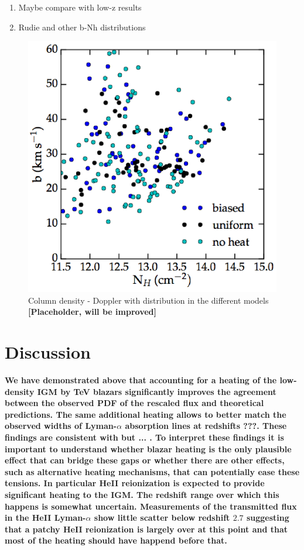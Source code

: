 \documentclass[numberedappendix]{emulateapj}
\newcommand\ALc[1]{{\color{red} \bf #1}} %
\newcommand\Ec[1]{{\color{magenta} \bf #1}} %
\begin{document}
\begin{enumerate}
\item Maybe compare with low-z results
\item Rudie and other b-Nh distributions
\end{enumerate}
\begin{figure}
\centering
\includegraphics[width = .45\textwidth ]{b_Nh}
\caption{ Column density - Doppler with distribution in the different models \ALc{[Placeholder, will be improved]}}
\label{fig:b_Nh}
\end{figure}



\section{Discussion}\label{sec:discussion}

\Ec{We have demonstrated above that accounting for a heating of the low-density IGM by TeV blazars significantly improves the agreement between the observed PDF of the rescaled flux and theoretical predictions. The same additional heating allows to better match the observed widths of Lyman-$\alpha$ absorption lines at redshifts ???. These findings are consistent with \citep{} but ... . To interpret these findings it is important to understand whether blazar heating is the only plausible effect that can bridge these gaps or whether there are other effects, such as alternative heating mechanisms, that can potentially ease these tensions. In particular HeII reionization is expected to provide significant heating to the IGM. The redshift range over which this happens is somewhat uncertain. Measurements of the transmitted flux in the HeII Lyman-$\alpha$ show little scatter below redshift $2.7$ \citep{2016ApJ...825..144W} suggesting that a patchy HeII reionization is largely over at this point and that most of the heating should have happend before that. }
\end{document}
